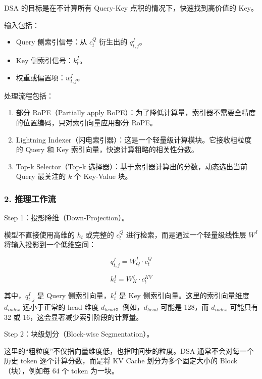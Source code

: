 DSA 的目标是在不计算所有 Query-Key 点积的情况下，快速找到高价值的 Key。

输入包括：

\begin{itemize}
\tightlist
\item
  Query 侧索引信号：从 \(c_t^Q\) 衍生出的 \(q^I_{t,j}\)。
\item
  Key 侧索引信号：\(k_t^I\)。
\item
  权重或偏置项：\(w^I_{t,j}\)。
\end{itemize}

处理流程包括：

\begin{enumerate}
\def\labelenumi{\arabic{enumi}.}
\tightlist
\item
  部分 RoPE（Partially apply RoPE）：为了降低计算量，索引器不需要全精度的位置编码，只对索引向量应用部分 RoPE。
\item
  Lightning Indexer（闪电索引器）：这是一个轻量级计算模块。它接收粗粒度的 Query 和 Key 索引向量，快速计算粗略的相关性分数。
\item
  Top-k Selector（Top-k 选择器）：基于索引器计算出的分数，动态选出当前 Query 最关注的 \(k\) 个 Key-Value 块。
\end{enumerate}

\hypertarget{ux63a8ux7406ux5de5ux4f5cux6d41}{%
\subsubsection{2. 推理工作流}\label{ux63a8ux7406ux5de5ux4f5cux6d41}}

Step 1：投影降维（Down-Projection）。

模型不直接使用高维的 \(h_t\) 或完整的 \(c_t^Q\) 进行检索，而是通过一个轻量级线性层 \(W^I\) 将输入投影到一个低维空间：

\[
q^I_{t,j} = W^I_Q \cdot c^Q_t
\]

\[
k^I_t = W^I_K \cdot c^{KV}_t
\]

其中，\(q^I_{t,j}\) 是 Query 侧索引向量，\(k^I_t\) 是 Key 侧索引向量。这里的索引向量维度 \(d_{index}\) 远小于正常的 head 维度 \(d_{head}\)。例如，\(d_{head}\) 可能是 128，而 \(d_{index}\) 可能只有 32 或 16，这会显著减少索引阶段的计算量。

Step 2：块级划分（Block-wise Segmentation）。

这里的``粗粒度''不仅指向量维度低，也指时间步的粒度。DSA 通常不会对每一个历史 token 逐个计算分数，而是将 KV Cache 划分为多个固定大小的 Block（块），例如每 64 个 token 为一块。

